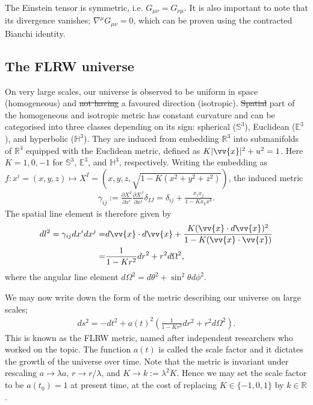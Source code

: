 \documentclass[a4paper,12pt,times,custombib,print,index]{Classes/PhDThesisPSnPDF} %
\providecommand{\DIFadd}[1]{{\protect\color{blue}\uwave{#1}}} %
\providecommand{\DIFdel}[1]{{\protect\color{red}\sout{#1}}}                      %
\providecommand{\DIFaddbegin}{} %
\providecommand{\DIFaddend}{} %
\providecommand{\DIFdelbegin}{} %
\providecommand{\DIFdelend}{} %
\newcommand{\DIFscaledelfig}{0.5}
\newlength{\DIFdelgraphicswidth} %
\newlength{\DIFdelgraphicsheight} %
\newcommand{\DIFaddincludegraphics}[2][]{{\color{blue}\fbox{\DIFOincludegraphics[#1]{#2}}}} %
\newcommand{\DIFdelincludegraphics}[2][]{%
\sbox{\DIFdelgraphicsbox}{\DIFOincludegraphics[#1]{#2}}%
\settoboxwidth{\DIFdelgraphicswidth}{\DIFdelgraphicsbox} %
\settoboxtotalheight{\DIFdelgraphicsheight}{\DIFdelgraphicsbox} %
\scalebox{\DIFscaledelfig}{%
\parbox[b]{\DIFdelgraphicswidth}{\usebox{\DIFdelgraphicsbox}\\[-\baselineskip] \rule{\DIFdelgraphicswidth}{0em}}\llap{\resizebox{\DIFdelgraphicswidth}{\DIFdelgraphicsheight}{%
\setlength{\unitlength}{\DIFdelgraphicswidth}%
\begin{picture}(1,1)%
\thicklines\linethickness{2pt} %
{\color[rgb]{1,0,0}\put(0,0){\framebox(1,1){}}}%
{\color[rgb]{1,0,0}\put(0,0){\line( 1,1){1}}}%
{\color[rgb]{1,0,0}\put(0,1){\line(1,-1){1}}}%
\end{picture}%
}\hspace*{3pt}}} %
} %
\DeclareRobustCommand{\DIFaddbegin}{\DIFOaddbegin \let\includegraphics\DIFaddincludegraphics} %
\DeclareRobustCommand{\DIFaddend}{\DIFOaddend \let\includegraphics\DIFOincludegraphics} %
\DeclareRobustCommand{\DIFdelbegin}{\DIFOdelbegin \let\includegraphics\DIFdelincludegraphics} %
\DeclareRobustCommand{\DIFdelend}{\DIFOaddend \let\includegraphics\DIFOincludegraphics} %
\begin{document}
The Einstein tensor is symmetric, i.e. $G_{\mu\nu} = G_{\nu\mu}$. It is also important to note that its divergence vanishes; $\nabla^\mu G_{\mu\nu} = 0$, which can be proven using the contracted Bianchi identity.


\subsection{The FLRW universe}
On very large scales, our universe is observed to be uniform in space (homogeneous) and \DIFdelbegin \DIFdel{not having }\DIFdelend \DIFaddbegin \DIFadd{does not have }\DIFaddend a favoured direction (isotropic). \DIFdelbegin \DIFdel{Spatial }\DIFdelend \DIFaddbegin \DIFadd{The spatial }\DIFaddend part of the homogeneous and isotropic metric has constant curvature and can be categorised into three classes depending on its sign: spherical ($\mathbb{S}^3$), Euclidean ($\mathbb{E}^3$), and hyperbolic ($\mathbb{H}^3$). They are induced from embedding $\mathbb{R}^3$ into submanifolds of $\mathbb{R}^4$ equipped with the Euclidean metric, defined as $K|\vv{x}|^2 + u^2 = 1$. Here $K=1,0,-1$ for $\mathbb{S}^3$, $\mathbb{E}^3$, and $\mathbb{H}^3$, respectively. Writing the embedding as $f: x^i = (x,y,z) \mapsto X^I =(x,y,z,\sqrt{1-K(x^2+y^2+z^2)})$, the induced metric \DIFaddbegin \DIFadd{is
}\DIFaddend \begin{align}
	\gamma_{ij} := \frac{\partial X^I}{\partial x^i} \frac{\partial X^J}{\partial x^j} \delta_{IJ}
	= \delta_{ij} + \frac{x_i x_j}{1-Kx_k x^k}. \label{eqn:FLRW_metric_spatial}
\end{align}
The spatial line element is therefore given by
\begin{align}
	dl^2 = \gamma_{ij} dx^i dx^j =& d\vv{x} \cdot d\vv{x} + \frac{K(\vv{x} \cdot d\vv{x})^2}{1-K (\vv{x} \cdot \vv{x})} \\
	=& \frac{1}{1-Kr^2} dr^2 + r^2 d\Omega^2,
\end{align}
where the angular line element $d\Omega^2 = d\theta^2 + \sin^2\theta d\phi^2$.

We may now write down the form of the metric describing our universe on large scales;
\begin{align}
	ds^2 = - dt^2 + a(t)^2 \left( \frac{1}{1-Kr^2} dr^2 + r^2 d\Omega^2 \right).
\end{align}
This is known as the FLRW metric, named after independent researchers who worked on the topic. The function $a(t)$ is called the scale factor and it dictates the growth of the universe over time. Note that the metric is invariant under rescaling $a \rightarrow \lambda a$, $r \rightarrow r / \lambda$, and $K \rightarrow k:= \lambda^2 K$. Hence we may set the scale factor to be $a(t_0) = 1$ at present time, at the cost of replacing $K \in \{-1,0,1\}$ by $k \in \mathbb{R}$.
\end{document}

